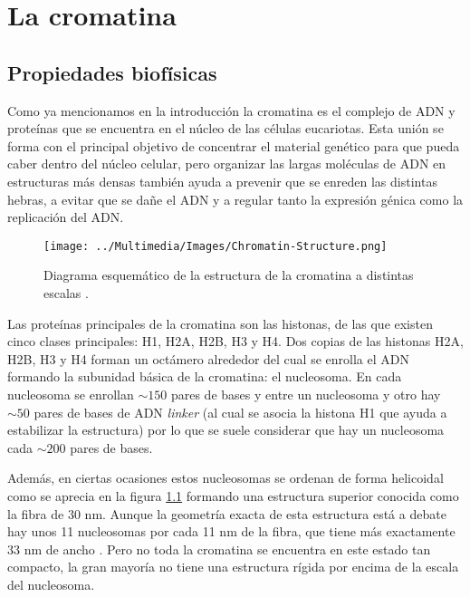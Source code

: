 \chapter{La cromatina}
\label{cap:chromatin}

\section{Propiedades biofísicas}

Como ya mencionamos en la introducción la cromatina es el complejo de ADN y proteínas que se encuentra en el núcleo de las células eucariotas. Esta unión se forma con el principal objetivo de concentrar el material genético para que pueda caber dentro del núcleo celular, pero organizar las largas moléculas de ADN en estructuras más densas también ayuda a prevenir que se enreden las distintas hebras, a evitar que se dañe el ADN y a regular tanto la expresión génica como la replicación del ADN.

\begin{figure}
    \centering
    \texttt{[image: ../Multimedia/Images/Chromatin-Structure.png]}
    \caption{Diagrama esquemático de la estructura de la cromatina a distintas escalas \cite{Felsenfeld2003}.}
    \label{fig:chromatin-structure}
\end{figure}

Las proteínas principales de la cromatina son las histonas, de las que existen cinco clases principales: H1, H2A, H2B, H3 y H4. Dos copias de las histonas H2A, H2B, H3 y H4 forman un octámero alrededor del cual se enrolla el ADN formando la subunidad básica de la cromatina: el nucleosoma. En cada nucleosoma se enrollan $\sim150$ pares de bases y entre un nucleosoma y otro hay $\sim50$ pares de bases de ADN \textit{linker} (al cual se asocia la histona H1 que ayuda a estabilizar la estructura) por lo que se suele considerar que hay un nucleosoma cada $\sim200$ pares de bases.

Además, en ciertas ocasiones estos nucleosomas se ordenan de forma helicoidal como se aprecia en la figura \ref{fig:chromatin-structure} formando una estructura superior conocida como la fibra de 30 nm. Aunque la geometría exacta de esta estructura está a debate hay unos 11 nucleosomas por cada 11 nm de la fibra, que tiene más exactamente 33 nm de ancho \cite{Robinson2006}. Pero no toda la cromatina se encuentra en este estado tan compacto, la gran mayoría no tiene una estructura rígida por encima de la escala del nucleosoma.

